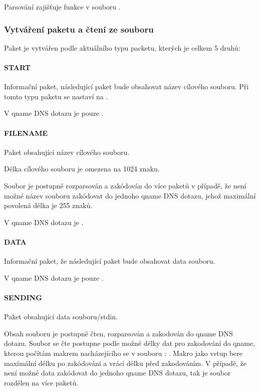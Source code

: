 Parsování zajišťuje funkce 
v souboru .

\subsubsection{Vytváření paketu a čtení ze souboru} \label{sec:vytvareni-paketu-k}

Paket je vytvářen podle aktuálního typu packetu, kterých je celkem 5 druhů:

\paragraph{START}
Informační paket, následující paket bude obsahovat název cílového souboru.
Při tomto typu paketu se nastaví  na .

V qname DNS dotazu je pouze .

\paragraph{FILENAME}
Paket obsahující název cílového souboru.

Délka cílového souboru je omezena na 1024 znaku.

Soubor je postupně rozparsován a zakódován
do více paketů v případě, že není možné název souboru
zakódovat do jednoho qname DNS dotazu,
jehož maximální povolená délka je 255 znaků\cite{dnsPacketInfo}.

V qname DNS dotazu je .

\paragraph{DATA}
Informační paket, že následující paket bude obsahovat data souboru.

V qname DNS dotazu je pouze .

\paragraph{SENDING}
Paket obsahující data souboru/stdin.

Obsah souboru je postupně čten, rozparsován a zakodován do qname DNS dotazu.
Soubor se čte postupne podle možné délky dat pro
zakodování do qname, kterou počítám
makrem nacházejícího se v souboru :
.
Makro jako vstup bere maxímální délku po zakódování a vrácí délku před zakodováním.
V případě, že není možné data zakódovat do jednoho qname DNS dotazu,
tak je soubor rozdělen na více paketů.

